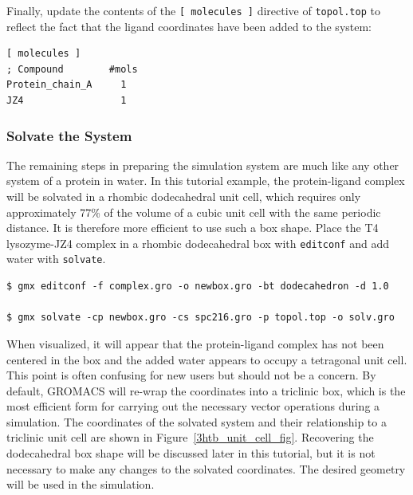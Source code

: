 \documentclass[9pt,tutorial,pubversion]{livecoms}
\begin{document}
Finally, update the contents of the \texttt{[ molecules ]} directive of \texttt{topol.top} to reflect the fact that the ligand coordinates have been added to the system:

\begin{lstlisting}[basicstyle=\footnotesize\ttfamily]
[ molecules ]
; Compound        #mols
Protein_chain_A     1
JZ4                 1
\end{lstlisting}

\subsubsection{Solvate the System} \label{complex_solv}

The remaining steps in preparing the simulation system are much like any other system of a protein in water. In this tutorial example, the protein-ligand complex will be solvated in a rhombic dodecahedral unit cell, which requires only approximately 77\% of the volume of a cubic unit cell with the same periodic distance. It is therefore more efficient to use such a box shape. Place the T4 lysozyme-JZ4 complex in a rhombic dodecahedral box with \texttt{editconf} and add water with \texttt{solvate}.

\begin{lstlisting}
$ gmx editconf -f complex.gro -o newbox.gro -bt dodecahedron -d 1.0

$ gmx solvate -cp newbox.gro -cs spc216.gro -p topol.top -o solv.gro
\end{lstlisting}

When visualized, it will appear that the protein-ligand complex has not been centered in the box and the added water appears to occupy a tetragonal unit cell. This point is often confusing for new users but should not be a concern. By default, GROMACS will re-wrap the coordinates into a triclinic box, which is the most efficient form for carrying out the necessary vector operations during a simulation. The coordinates of the solvated system and their relationship to a triclinic unit cell are shown in Figure~\ref{3htb_unit_cell_fig}. Recovering the dodecahedral box shape will be discussed later in this tutorial, but it is not necessary to make any changes to the solvated coordinates. The desired geometry will be used in the simulation.
\end{document}
